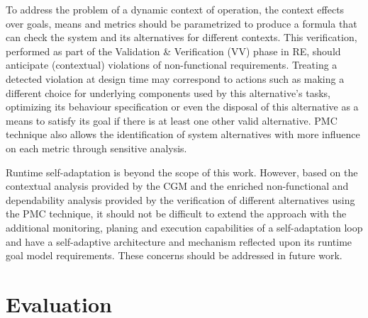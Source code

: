 To address the problem of a dynamic context of operation, the context effects over goals, means and metrics should be parametrized to produce a formula that can check the system and its alternatives for different contexts. This verification, performed as part of the Validation \& Verification (VV) phase in RE, should anticipate (contextual) violations of non-functional requirements. Treating a detected violation at design time may correspond to actions such as making a different choice for underlying components used by this alternative's tasks, optimizing its behaviour specification or even the disposal of this alternative as a means to satisfy its goal if there is at least one other valid alternative. PMC technique also allows the identification of system alternatives with more influence on each metric through sensitive analysis. 

Runtime self-adaptation is beyond the scope of this work. However, based on the contextual analysis provided by the CGM and the enriched non-functional and dependability analysis provided by the verification of different alternatives using the PMC technique, it should not be difficult to extend the approach with the additional monitoring, planing and execution capabilities of a self-adaptation loop and have a self-adaptive architecture and mechanism reflected upon its runtime goal model requirements. These concerns should be addressed in future work.




\section{Evaluation}

